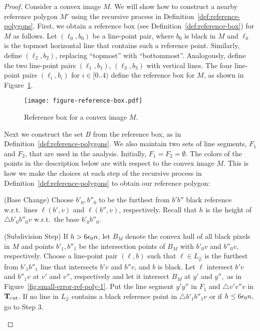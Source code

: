 \documentclass[11pt,english]{article}
\renewenvironment{enumerate}[1]{\begin{compactenum}#1}{\end{compactenum}}
\numberwithin{figure}{section}
\newcommand{\integerset}[1]{[0..{#1})}
\newcommand{\Tcut}{{\bf T}_{\text{cut}}}
\begin{document}
\begin{proof}
Consider a convex image $M$. We will show how to construct a nearby reference polygon $M'$ using the recursive process in Definition~\ref{def:reference-polygons}. First, we obtain a reference box (see Definition~\ref{def:reference-box}) for $M$ as follows. Let $(\ell_0,b_0)$ be a line-point pair, where $b_0$ is black in $M$ and $\ell_0$ is the topmost horizontal line that contains such a reference point. Similarly, define $(\ell_2,b_2)$, replacing ``topmost'' with ``bottommost''. Analogously, define the two line-point pairs $(\ell_1,b_1)$, $(\ell_3,b_3)$ with vertical lines. The four line-point pairs $(\ell_i,b_i)$ for $i\in\integerset{4}$ define the reference box for $M$, as shown in Figure~\ref{fig:reference-box}.

\begin{figure}[ht]
\centering
\texttt{[image: figure-reference-box.pdf]}
\caption{ Reference box for a convex image $M$.}
\label{fig:reference-box}
\end{figure}




Next we construct the set $B$ from the reference box, as in Definition~\ref{def:reference-polygons}.  We also maintain two sets of line segments, $F_1$ and $F_2$, that are used in the analysis. Initially, $F_1=F_2=\emptyset$. The colors of the points in the description below are with respect to the convex image $M$. This is how we make the choices at each step of the recursive process in Definition~\ref{def:reference-polygons} to obtain our reference polygon:
\begin{enumerate}
\item {\sf (Base Change)} Choose $b'_0,b''_0$ to be the furthest from $b'b''$ black reference w.r.t.\ lines $\ell(b',v)$ and $\ell(b'',v)$, respectively. Recall that $h$ is the height of $\bigtriangleup b'_0b''_0v$ w.r.t.\ the base $b'_0b''_0$.

\item {\sf (Subdivision Step)} If $h>6{\epsilon_0} n$, let $B_M$ denote the convex hull of all black pixels in $M$ and points $b'_1,b''_1$ be the intersection points of $B_M$ with $b'_0v$ and $b''_0v$, respectively. Choose a line-point pair $(\ell,b)$ such that $\ell\in L_{\hat\varphi}$ is the furthest from $b'_1b''_1$ line that intersects $b'v$ and $b''v$,  and $b$ is black.  Let $\ell$ intersect $b'v$ and $b''_1v$ at $v'$ and $v''$, respectively and let it intersect $B_M$ at $y'$ and $y'',$ as in Figure~\ref{fig:small-error-ref-poly-1}. Put the line segment $y'y''$ in $F_1$ and $\bigtriangleup v'v''v$ in $\Tcut$. If no line in $L_{\hat\varphi}$ contains a black reference point in $\bigtriangleup b'_1b''_1v$ or if $h\leq 6{\epsilon_0} n,$ go to Step 3.


\end{enumerate}
\end{proof}
\end{document}
